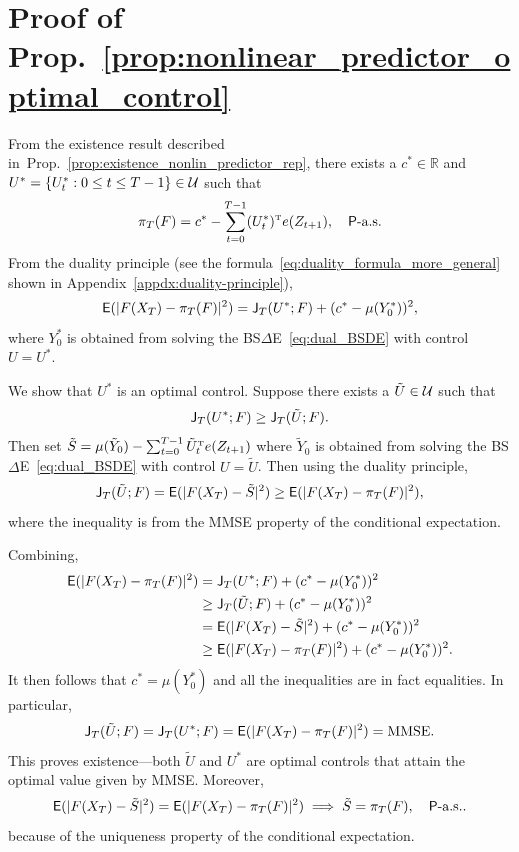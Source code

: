 \documentclass[twoside,11pt]{article}
\def\Re{\mathbb{R}}
\newcommand{\field}[1]{\mathbb{#1}}
\def\Re{\field{R}}
\def\E{{\sf E}}
\def\Re{\mathbb{R}}
\def\E{{\sf E}}
\def\Prop#1{Prop.~\ref{#1}}
\renewcommand{\Re}{\mathbb{R}}
\def\clU{{\cal U}}
\def\E{{\sf E}}
\def\sJ{{\sf J}}
\def\sP{{\sf P}}
\def\tp{{\hbox{\rm\tiny T}}}
\begin{document}
\section{Proof of \Prop{prop:nonlinear_predictor_optimal_control}}
\label{appdx:nonlinear_predictor_optimal_control}

From the existence result described
in~\Prop{prop:existence_nonlin_predictor_rep}, there exists a 
$c^*\in\Re$ and $U^*=\{U_t^*:0\leq t\leq T-1\}\in\clU$ such that
  \begin{equation*}
   \pi_T(F) = c^*- \sum_{t=0}^{T-1} (U_t^*)^\tp e(Z_{t+1}),\quad \sP\text{-a.s.}
 \end{equation*}  
 From the duality principle (see the formula~\eqref{eq:duality_formula_more_general} shown in
  Appendix~\ref{appdx:duality-principle}),
  \begin{equation*}
\E (|F(X_T) - \pi_T(F)|^2) = \sJ_T(U^*;F) + (c^* - \mu(Y_0^*))^2,
\end{equation*}
where $Y_0^*$ is obtained from solving the BS$\Delta$E~\eqref{eq:dual_BSDE} with control
$U=U^*$.


We show that $U^*$ is an optimal control.  Suppose there exists a
$\tilde{U}\in \clU$  such that 
\begin{equation*}
\sJ_T(U^*;F)  \geq \sJ_T(\tilde{U};F).
\end{equation*}
Then set $\tilde{S} = \mu(\tilde{Y}_0) - \sum_{t=0}^{T-1}
  \tilde{U}_t^\tp e(Z_{t+1})$ where $\tilde{Y}_0$ is obtained from solving the BS$\Delta$E~\eqref{eq:dual_BSDE} with control
$U=\tilde{U}$.  Then
  using the duality principle,
  \begin{equation*}
\sJ_T(\tilde{U};F) = \E (|F(X_T) - \tilde{S}|^2) \geq \E (|F(X_T) - \pi_T(F)|^2),
\end{equation*}
where the inequality is from the MMSE property of the conditional expectation.

Combining,
\begin{align*}
  \E (|F(X_T) - \pi_T(F)|^2) &= \sJ_T(U^*;F) + (c^* - \mu(Y_0^*))^2 \\
                             & \geq  \sJ_T(\tilde{U};F) + (c^* - \mu(Y_0^*))^2 \\
& = \E (|F(X_T) - \tilde{S}|^2) + (c^* - \mu(Y_0^*))^2
  \\
  & \geq \E (|F(X_T) - \pi_T(F)|^2) + (c^* - \mu(Y_0^*))^2 .
\end{align*}   
It then follows that $c^* = \mu(Y_0^*)$ and all the inequalities
  are in fact equalities.  In particular, 
  \begin{equation*}
\sJ_T(\tilde{U};F) = \sJ_T(U^*;F)  = \E (|F(X_T) - \pi_T(F)|^2) = \text{MMSE}.
\end{equation*}
This proves existence---both $\tilde{U}$ and $U^*$ are optimal controls
that attain the optimal value given by MMSE.  Moreover,
\begin{equation*}
\E (|F(X_T) - \tilde{S}|^2) = \E (|F(X_T) - \pi_T(F)|^2) \implies
\tilde{S} = \pi_T(F),\quad \sP\text{-a.s.}.
\end{equation*}
because of the uniqueness property of the conditional expectation.
\end{document}
